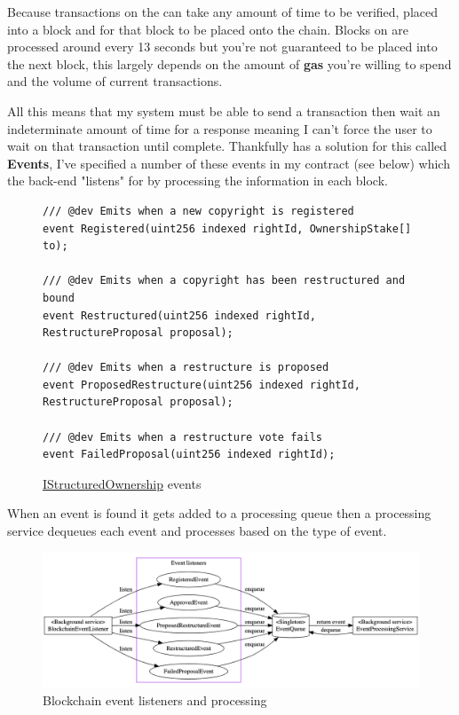 Because transactions on the  can take any amount of time to be verified, placed into a block and for that block to be placed onto the chain. Blocks on  are processed around every 13 seconds but you're not guaranteed to be placed into the next block, this largely depends on the amount of \textbf{gas} you're willing to spend and the volume of current transactions.

All this means that my system must be able to send a transaction then wait an indeterminate amount of time for a response meaning I can't force the user to wait on that transaction until complete. Thankfully  has a solution for this  called \textbf{Events}, I've specified a number of these events in my contract (see below) which the back-end "listens" for by processing the information in each block.

\begin{figure}[H]
\caption{\href{https://github.com/MrHarrisonBarker/CRPL/blob/main/CRPL.Contracts/contracts/IStructuredOwnership.sol}{IStructuredOwnership} events}
\begin{lstlisting}[language=Solidity]
/// @dev Emits when a new copyright is registered
event Registered(uint256 indexed rightId, OwnershipStake[] to);

/// @dev Emits when a copyright has been restructured and bound
event Restructured(uint256 indexed rightId, RestructureProposal proposal);

/// @dev Emits when a restructure is proposed
event ProposedRestructure(uint256 indexed rightId, RestructureProposal proposal);

/// @dev Emits when a restructure vote fails
event FailedProposal(uint256 indexed rightId);
\end{lstlisting}
\end{figure}

When an event is found it gets added to a processing queue then a processing service dequeues each event and processes based on the type of event.

\begin{figure}[H]
\caption{Blockchain event listeners and processing}
\centering
\includegraphics[width=\textwidth,height=0.5\textheight,keepaspectratio]{images/operational/Event-Listening}
\end{figure}

